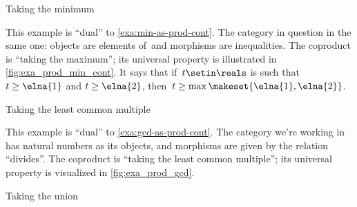 \begin{figure}[h!]
    \centering
    \caption{}
    \label{fig:coprod_disunion_diagram}
\end{figure}

\begin{marginfigure}
    \centering
    \caption{Taking the minimum}
    \label{fig:exa_coprod_max_cont}
\end{marginfigure}

\begin{example}
    \label{exa:max-as-coprod}
    This example is ``dual'' to \cref{exa:min-as-prod-cont}.
    The category in question in the same one: objects are elements of~\reals and morphisms are inequalities.
    The coproduct is ``taking the maximum''; its universal property is illustrated in \cref{fig:exa_prod_min_cont}.
    It says that if~$t \setin \reals$ is such that~$t \geq \elna{1}$ and $t \geq \elna{2}$, then~$t \geq \max \makeset{ \elna{1}, \elna{2} }$.

\end{example}

\begin{marginfigure}
    \centering
    \caption{Taking the least common multiple}
    \label{fig:exa_coprod_lcm_cont}
\end{marginfigure}
\begin{example}
    \label{exa:lcm-as-coprod-cont}
    This example is ``dual'' to \cref{exa:gcd-as-prod-cont}.
    The category we're working in has natural numbers as its objects, and morphisms are given by the relation ``divides''.
    The coproduct is ``taking the least common multiple''; its universal property is visualized in \cref{fig:exa_prod_gcd}.
\end{example}

\begin{marginfigure}
    \centering
    \caption{Taking the union}
    \label{fig:exa_coprod_union_cont}
\end{marginfigure}

